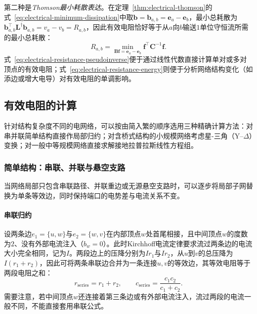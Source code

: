 第二种是\emph{Thomson最小耗散表达}。在定理~\ref{thm:electrical-thomson}的式~\eqref{eq:electrical-minimum-dissipation}中取$\bm b = \bm b_{a,b} = \bm e_a - \bm e_b$，最小总耗散为$\bm b_{a,b}^\top\bm L^\dagger\bm b_{a,b} = v_a - v_b = R_{a,b}$，因此有效电阻恰好等于从$a$向$b$输送$1$单位守恒流所需的最小总耗散：
\begin{equation}
  R_{a,b} = \min_{\bm B\bm f = \bm e_a - \bm e_b} \bm f^\top \bm C^{-1} \bm f.
  \label{eq:electrical-resistance-energy}
\end{equation}
式~\eqref{eq:electrical-resistance-pseudoinverse}便于通过线性代数直接计算单对或多对顶点的有效电阻；式~\eqref{eq:electrical-resistance-energy}则便于分析网络结构变化（如添边或增大电导）对有效电阻的单调影响。

\subsection{有效电阻的计算}
\label{sec:electrical-series-parallel}

针对结构复杂度不同的电网络，可以按由简入繁的顺序选用三种精确计算方法：对串并联简单结构直接作局部归约；对含桥式结构的小规模网络考虑星-三角（$\text{Y--}\Delta$）变换；对一般中等规模网络直接求解接地拉普拉斯线性方程组。

\subsubsection{简单结构：串联、并联与悬空支路}
\label{sec:electrical-simple-reductions}

当网络局部只包含串联路径、并联重边或无源悬空支路时，可以逐步将局部子网替换为单条等效边，同时保持端口的电势差与电流关系不变。

\paragraph{串联归约}
设两条边$e_1=\{u,w\}$与$e_2=\{w,v\}$在内部顶点$w$处首尾相接，且中间顶点$w$的度数为$2$、没有外部电流注入（$b_w=0$）。此时Kirchhoff电流定律要求流过两条边的电流大小完全相同，记为$I$。两段边上的压降分别为$I r_1$与$I r_2$，从$u$到$v$的总压降为$I(r_1 + r_2)$，因此可将两条串联边合并为一条连接$u,v$的等效边，其等效电阻等于两段电阻之和：
\begin{equation}
  r_{\mathrm{series}} = r_1 + r_2, \qquad
  c_{\mathrm{series}} = \frac{c_1 c_2}{c_1 + c_2}.
  \label{eq:electrical-series}
\end{equation}
需要注意，若中间顶点$w$还连接着第三条边或有外部电流注入，流过两段的电流一般不同，不能直接套用串联公式。

